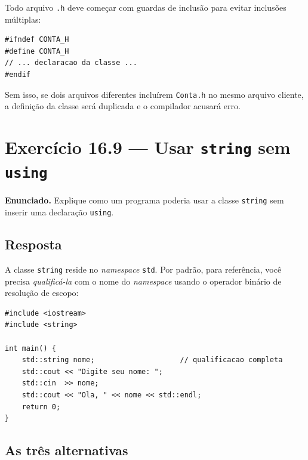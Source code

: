 \documentclass[11pt,a4paper]{article}
\begin{document}
\begin{boaprat}
Todo arquivo \texttt{.h} deve come\c{c}ar com guardas de inclus\~ao para evitar inclus\~oes m\'ultiplas:
\begin{lstlisting}[style=cppcode,numbers=none]
#ifndef CONTA_H
#define CONTA_H
// ... declaracao da classe ...
#endif
\end{lstlisting}
Sem isso, se dois arquivos diferentes inclu\'irem \texttt{Conta.h} no mesmo arquivo cliente, a defini\c{c}\~ao da classe ser\'a duplicada e o compilador acusar\'a erro.
\end{boaprat}

\section{Exerc\'icio 16.9 --- Usar \texttt{string} sem \texttt{using}}

\begin{enunciado}
\textbf{Enunciado.} Explique como um programa poderia usar a classe \texttt{string} sem inserir uma declara\c{c}\~ao \texttt{using}.
\end{enunciado}

\subsection*{Resposta}

A classe \texttt{string} reside no \emph{namespace} \texttt{std}. Por padr\~ao, para refer\^encia, voc\^e precisa \emph{qualific\'a-la} com o nome do \emph{namespace} usando o operador bin\'ario de resolu\c{c}\~ao de escopo:

\begin{lstlisting}[style=cppcode,numbers=none]
#include <iostream>
#include <string>

int main() {
    std::string nome;                    // qualificacao completa
    std::cout << "Digite seu nome: ";
    std::cin  >> nome;
    std::cout << "Ola, " << nome << std::endl;
    return 0;
}
\end{lstlisting}

\subsection*{As tr\^es alternativas}
\end{document}
